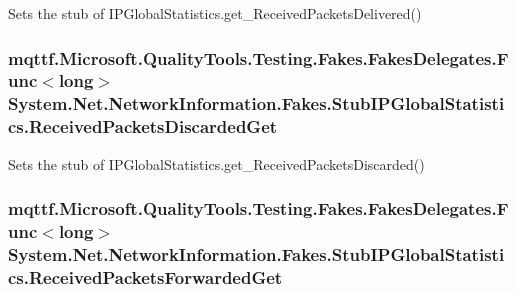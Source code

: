 Sets the stub of I\-P\-Global\-Statistics.\-get\-\_\-\-Received\-Packets\-Delivered()

\hypertarget{class_system_1_1_net_1_1_network_information_1_1_fakes_1_1_stub_i_p_global_statistics_a9e10534f4f613481be692f8080ab08a6}{
\subsubsection[{Received\-Packets\-Discarded\-Get}]{\setlength{\rightskip}{0pt plus 5cm}mqttf.\-Microsoft.\-Quality\-Tools.\-Testing.\-Fakes.\-Fakes\-Delegates.\-Func$<$long$>$ System.\-Net.\-Network\-Information.\-Fakes.\-Stub\-I\-P\-Global\-Statistics.\-Received\-Packets\-Discarded\-Get}}\label{class_system_1_1_net_1_1_network_information_1_1_fakes_1_1_stub_i_p_global_statistics_a9e10534f4f613481be692f8080ab08a6}


Sets the stub of I\-P\-Global\-Statistics.\-get\-\_\-\-Received\-Packets\-Discarded()

\hypertarget{class_system_1_1_net_1_1_network_information_1_1_fakes_1_1_stub_i_p_global_statistics_ad2221c460ebc2fc2ff965dde0618c6a6}{
\subsubsection[{Received\-Packets\-Forwarded\-Get}]{\setlength{\rightskip}{0pt plus 5cm}mqttf.\-Microsoft.\-Quality\-Tools.\-Testing.\-Fakes.\-Fakes\-Delegates.\-Func$<$long$>$ System.\-Net.\-Network\-Information.\-Fakes.\-Stub\-I\-P\-Global\-Statistics.\-Received\-Packets\-Forwarded\-Get}}\label{class_system_1_1_net_1_1_network_information_1_1_fakes_1_1_stub_i_p_global_statistics_ad2221c460ebc2fc2ff965dde0618c6a6}


